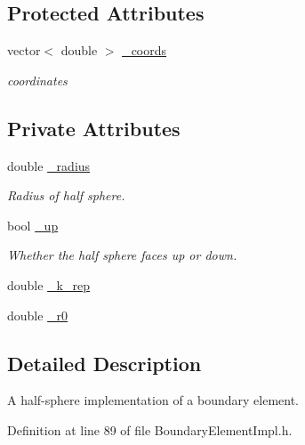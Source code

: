 \subsection*{Protected Attributes}
\begin{DoxyCompactItemize}
\item 
vector$<$ double $>$ \hyperlink{classBoundaryElement_ab51302e10e3e2def98438234ba5bf801}{\+\_\+coords}
\begin{DoxyCompactList}\small\item\em coordinates \end{DoxyCompactList}\end{DoxyCompactItemize}
\subsection*{Private Attributes}
\begin{DoxyCompactItemize}
\item 
double \hyperlink{classHalfSphereZBoundaryElement_ad1fff310ac2c3f221a8ab7393dc23b69}{\+\_\+radius}
\begin{DoxyCompactList}\small\item\em Radius of half sphere. \end{DoxyCompactList}\item 
bool \hyperlink{classHalfSphereZBoundaryElement_a3251d9e34c161076f9324dc3f2477720}{\+\_\+up}
\begin{DoxyCompactList}\small\item\em Whether the half sphere faces up or down. \end{DoxyCompactList}\item 
double \hyperlink{classHalfSphereZBoundaryElement_aaafd14a29987646f9537a7248ba6291b}{\+\_\+k\+\_\+rep}
\item 
double \hyperlink{classHalfSphereZBoundaryElement_afa790cdbea557aa8615188211acaedce}{\+\_\+r0}
\end{DoxyCompactItemize}


\subsection{Detailed Description}
A half-\/sphere implementation of a boundary element. 

Definition at line 89 of file Boundary\+Element\+Impl.\+h.



